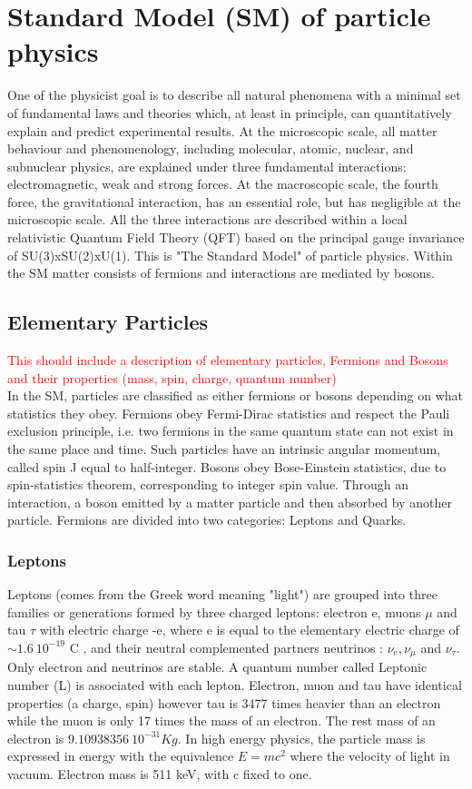 \section{Standard Model (SM) of particle physics}
\label{chap1:SM}
One of the physicist goal is to describe all natural phenomena with a minimal set of fundamental laws and theories which, at least in principle, can quantitatively explain and predict experimental results. At the microscopic scale, all matter behaviour and phenomenology, including molecular, atomic, nuclear, and subnuclear physics, are explained under three fundamental interactions: electromagnetic, weak and strong forces. At the macroscopic scale, the fourth force, the gravitational interaction, has an essential role, but has negligible at the microscopic scale. All the three interactions are described within a local relativistic Quantum Field Theory (QFT) based on the principal gauge invariance of SU(3)xSU(2)xU(1). This is "The Standard Model" of particle physics. Within the SM matter consists of fermions and interactions are mediated by bosons. 

\subsection{Elementary Particles}
\label{chap1:SM:EP}
\textcolor{red}{
This should include a description of elementary particles, Fermions and  Bosons and their properties (mass, spin, charge, quantum number)
\\ }
In the SM, particles are classified as either fermions or bosons depending on what statistics they obey. Fermions obey Fermi-Dirac statistics and respect the Pauli exclusion principle, i.e. two fermions in the same quantum state can not exist in the same place and time. Such particles have an intrinsic angular momentum, called spin J equal to half-integer. Bosons obey Bose-Einstein statistics, due to spin-statistics theorem, corresponding to integer spin value. Through an interaction, a boson emitted by a matter particle and then absorbed by another particle. Fermions are divided into two categories: Leptons and Quarks.
\subsubsection{Leptons}
Leptons (comes from the Greek word meaning "light") are grouped into three families or generations formed by three charged leptons: electron e, muons $\mu$ and tau $\tau$ with electric charge -e, where e is equal to the elementary electric charge of $\sim 1.6 \ 10^{-19} $ C \cite{PDG}, and their neutral complemented partners neutrinos : $\nu_{e}, \nu_{\mu}$ and $\nu_{\tau}$. Only electron and neutrinos are stable. A quantum number called Leptonic number (L) is associated with each lepton. Electron, muon and tau have identical properties (a charge, spin) however tau is 3477 times heavier than an electron while the muon is only 17 times the mass of an electron. The rest mass of an electron is $9.10938356 \ 10^{-31} Kg$. In high energy physics, the particle mass is expressed in energy with the equivalence $E=mc^2$ where the velocity of light in vacuum. Electron mass is 511 keV, with c fixed to one.

